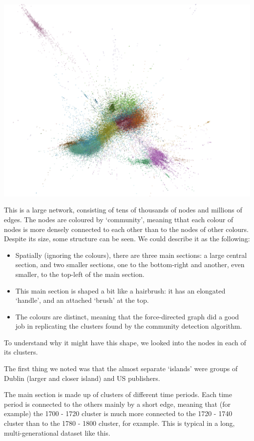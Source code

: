 \documentclass[
]{book}
\begin{document}
\includegraphics{images/full_net.png}

This is a large network, consisting of tens of thousands of nodes and millions of edges. The nodes are coloured by `community', meaning tthat each colour of nodes is more densely connected to each other than to the nodes of other colours. Despite its size, some structure can be seen. We could describe it as the following:

\begin{itemize}
\item
  Spatially (ignoring the colours), there are three main sections: a large central section, and two smaller sections, one to the bottom-right and another, even smaller, to the top-left of the main section.
\item
  This main section is shaped a bit like a hairbrush: it has an elongated `handle', and an attached `brush' at the top.
\item
  The colours are distinct, meaning that the force-directed graph did a good job in replicating the clusters found by the community detection algorithm.
\end{itemize}

To understand why it might have this shape, we looked into the nodes in each of its clusters.

The first thing we noted was that the almost separate `islands' were groups of Dublin (larger and closer island) and US publishers.

The main section is made up of clusters of different time periods. Each time period is connected to the others mainly by a short edge, meaning that (for example) the 1700 - 1720 cluster is much more connected to the 1720 - 1740 cluster than to the 1780 - 1800 cluster, for example. This is typical in a long, multi-generational dataset like this.
\end{document}
